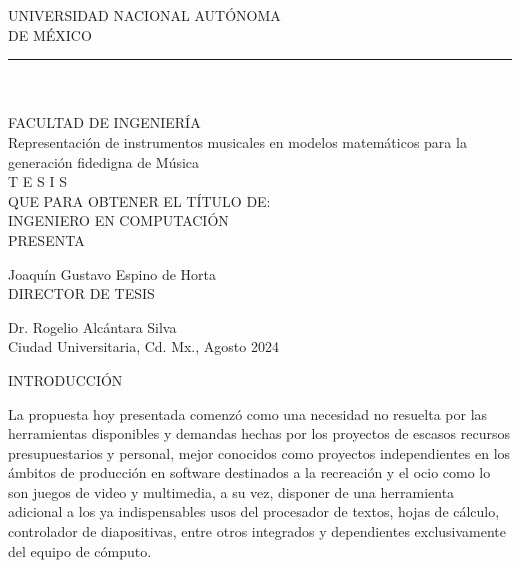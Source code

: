 \documentclass{book}
\begin{document}
	\begin{minipage}{.7\textwidth}
		\begin{flushright}
				\begin{center}
				\begin{center}
					\LARGE{U}\large{NIVERSIDAD} \LARGE{N}\large{ACIONAL} 
					\LARGE{A}\large{UTÓNOMA} \\[10pt]
					\large{DE} 
					\LARGE{M}\large{ÉXICO} 
				\end{center}
				\rule{\textwidth}{2pt}
				\\
				\hrulefill\\[1cm]
				
				\LARGE{F}\large{ACULTAD DE } \LARGE{I}\large{NGENIERÍA}\\[2cm]
				
				\large{Representación de instrumentos musicales en modelos matemáticos para la generación fidedigna de Música}\\[1.5cm]
				
				\huge{T E S I S }\\[1.5cm]
				
				\large{QUE PARA OBTENER EL TÍTULO DE:}\\[1cm]
				
				\large{INGENIERO EN COMPUTACIÓN}\\[1cm]
				
				\large{PRESENTA}
				
				\large{Joaquín Gustavo Espino de Horta}\\[1cm]
				
				\large{DIRECTOR DE TESIS}
				
				\large{Dr. Rogelio Alcántara Silva}\\[1cm]
				
				\large{Ciudad Universitaria, Cd. Mx., Agosto 2024}
				
			\end{center}
		\end{flushright}
	
	\end{minipage}
	
	
	\pagebreak
	\begin{minipage}{.7\textwidth}
	\begin{flushleft}
		\vspace{10pt}
		\begin{center}
			\Large{INTRODUCCIÓN}
			\hrulefill\\[1.5cm]
		\end{center}
	\end{flushleft}
	\end{minipage}\par
	La propuesta hoy presentada comenzó como una necesidad no resuelta por las herramientas disponibles y demandas hechas por los proyectos de escasos recursos presupuestarios y personal, mejor conocidos como proyectos independientes en los ámbitos de producción en software destinados a la recreación y el ocio como lo son juegos de video y multimedia, a su vez, disponer de una herramienta adicional a los ya indispensables usos del procesador de textos, hojas de cálculo, controlador de diapositivas, entre otros integrados y dependientes exclusivamente del equipo de cómputo. \par
	
\end{document}
